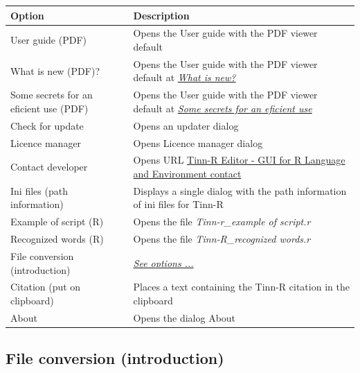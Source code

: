 \begin{scriptsize}
  \begin{tabularx}{\textwidth}{>{\hsize=0.3\hsize}X>{\hsize=0.7\hsize}X}\\
    \hline
    \textbf{Option} & \textbf{Description} \\
    \hline
    User guide (PDF) & Opens the User guide with the PDF viewer default \\
    What is new (PDF)? & Opens the User guide with the PDF viewer default at
     \textit{\href{\#whatisnew}{What is new?}} \\
    Some secrets for an eficient use (PDF) & Opens the User guide with the PDF viewer default at
     \textit{\href{\#secrets}{Some secrets for an eficient use}} \\
    \hdashline[1pt/1pt]
    Check for update & Opens an updater dialog \\
    Licence manager & Opens Licence manager dialog \\
    Contact developer & Opens URL
     \href{https://tinn-r.org/en/contact}
     {Tinn-R Editor - GUI for R Language and Environment contact} \\
    \hdashline[1pt/1pt]
    Ini files (path information) & Displays a single dialog with the path information of ini files for Tinn-R \\
    Example of script (R) & Opens the file \textit{Tinn-r\_example of script.r} \\
    Recognized words (R) & Opens the file \textit{Tinn-R\_recognized words.r} \\
    File conversion (introduction) & \textit{\href{\#menu\_help\_main\_fileconversion}{See options ...}} \\
    \hdashline[1pt/1pt]
    Citation (put on clipboard) & Places a text containing the Tinn-R citation in the clipboard \\
    About & Opens the dialog About \\
    \hline
  \end{tabularx}
\end{scriptsize}


\hypertarget{menu_help_main_fileconversion}{}
\subsection{File conversion (introduction)}

